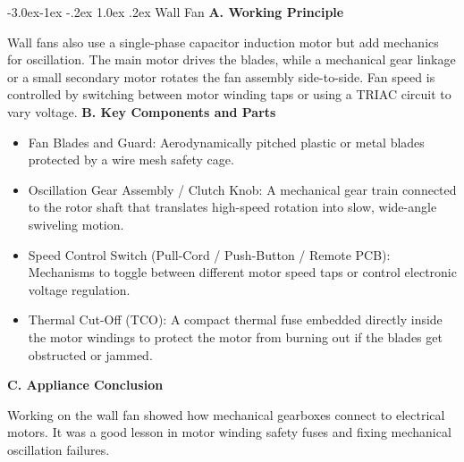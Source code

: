 \documentclass[11pt,a4paper]{report}
\makeatletter
\renewcommand{\subsection}{\@startsection{subsection}{2}{\z@}%
  {-3.0ex\@plus -1ex \@minus -.2ex}%
  {1.0ex \@plus .2ex}%
  {\normalfont\large\bfseries\color{secondaryColor}}}
\makeatother
\begin{document}
\subsection{Wall Fan}
\noindent\textbf{A. Working Principle}\par\medskip
Wall fans also use a single-phase capacitor induction motor but add mechanics for oscillation. The main motor drives the blades, while a mechanical gear linkage or a small secondary motor rotates the fan assembly side-to-side. Fan speed is controlled by switching between motor winding taps or using a TRIAC circuit to vary voltage.
\noindent\textbf{B. Key Components and Parts}\par\medskip
\begin{itemize}
  \item Fan Blades and Guard: Aerodynamically pitched plastic or metal blades protected by a wire mesh safety cage.
  \item Oscillation Gear Assembly / Clutch Knob: A mechanical gear train connected to the rotor shaft that translates high-speed rotation into slow, wide-angle swiveling motion.
  \item Speed Control Switch (Pull-Cord / Push-Button / Remote PCB): Mechanisms to toggle between different motor speed taps or control electronic voltage regulation.
  \item Thermal Cut-Off (TCO): A compact thermal fuse embedded directly inside the motor windings to protect the motor from burning out if the blades get obstructed or jammed.
\end{itemize}
\noindent\textbf{C. Appliance Conclusion}\par\medskip
Working on the wall fan showed how mechanical gearboxes connect to electrical motors. It was a good lesson in motor winding safety fuses and fixing mechanical oscillation failures.
\end{document}

